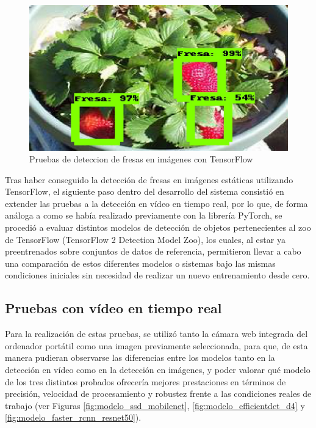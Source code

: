 \begin{figure}[H]
\begin{minipage}{0.45\textwidth}
  \end{minipage}
  \hspace{2mm}
  \begin{minipage}{0.45\textwidth}
    \centering
    \includegraphics[width=\linewidth]{figs/1000.jpeg}
  \end{minipage}
  \caption{Pruebas de deteccion de fresas en imágenes con TensorFlow}
  \label{fig:Deteccion_Fresas_Imagenes_TF}
  \end{figure}

Tras haber conseguido la detección de fresas en imágenes estáticas utilizando TensorFlow, el siguiente paso dentro del desarrollo del sistema consistió en extender las pruebas a la detección en vídeo en tiempo real, por lo que, de forma análoga a como se había realizado previamente con la librería PyTorch, se procedió a evaluar distintos modelos de detección de objetos pertenecientes al zoo de TensorFlow (TensorFlow 2 Detection Model Zoo), los cuales, al estar ya preentrenados sobre conjuntos de datos de referencia, permitieron llevar a cabo una comparación de estos diferentes modelos o sistemas bajo las mismas condiciones iniciales sin necesidad de realizar un nuevo entrenamiento desde cero. 

\subsection{Pruebas con vídeo en tiempo real}
\label{sec:Pruebas_video_TF}

Para la realización de estas pruebas, se utilizó tanto la cámara web integrada del ordenador portátil como una imagen previamente seleccionada, para que, de esta manera pudieran observarse las diferencias entre los modelos tanto en la detección en vídeo como en la detección en imágenes, y poder valorar qué modelo de los tres distintos probados ofrecería mejores prestaciones en términos de precisión, velocidad de procesamiento y robustez frente a las condiciones reales de trabajo (ver Figuras  \ref{fig:modelo_ssd_mobilenet}, \ref{fig:modelo_efficientdet_d4} y \ref{fig:modelo_faster_rcnn_resnet50}). 

